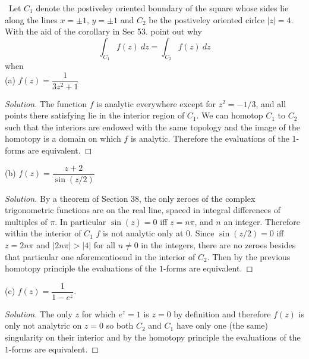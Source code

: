 \documentclass[11pt]{amsart}
\theoremstyle{definition}
\numberwithin{theorem}{section}
\numberwithin{definition}{section}
\numberwithin{equation}{section}
\newenvironment{solution}
  {\begin{proof}[Solution]}
  {\end{proof}}
\begin{document}
\medskip {}\ Let $C_1$ denote the postiveley oriented boundary of the square whose sides lie along the lines $x = \pm 1$, $y = \pm 1$ and $C_2$ be the  postiveley oriented cirlce $|z| = 4$. With the aid of the corollary in Sec 53. point out why
\begin{equation*}
	\int_{C_1} f(z)\ dz = \int_{C_2} f(z)\ dz
\end{equation*}
when \\
(a) $f(z) = \dfrac{1}{3z^2 + 1}$
\begin{solution}
The function $f$ is analytic everywhere except for $z^2 = -1/3$, and all points there satisfying lie in the interior region of $C_1$. We can homotop $C_1$ to $C_2$ such that the interiors are endowed with the same topology and the image of the homotopy is a domain on which $f$ is analytic. Therefore the evaluations of the $1$-forms are equivalent.
\end{solution}
\noindent (b) $f(z) = \dfrac{z+2}{\sin{(z/2)}}$
\begin{solution}
	By a theorem of Section 38, the only zeroes of the complex trigonometric functions are on the real line, spaced in integral differences of multiples of $\pi$. In particular $\sin(z) = 0$ iff $z = n\pi$, and $n$ an integer. Therefore within the interior of $C_1$ $f$ is not analytic only at $0$. Since $\sin(z/2) = 0$ iff $z = 2n\pi$ and $|2n\pi| > |4|$ for all $n \neq 0$ in the integers, there are no zeroes besides that particular one aforementioend in the interior of $C_2$. Then by the previous homotopy principle the evaluations of the $1$-forms are equivalent.
\end{solution}
\noindent (c) $f(z) = \dfrac{1}{1-e^z}$.
\begin{solution}
 	The only $z$ for which $e^z = 1$ is $z = 0$ by definition and therefore $f(z)$ is only not analytric on $z = 0$ so both $C_2$ and $C_1$ have only one (the same) singularity on their interior  and by the homotopy principle  the evaluations of the $1$-forms are equivalent.
 \end{solution} 
\end{document}
